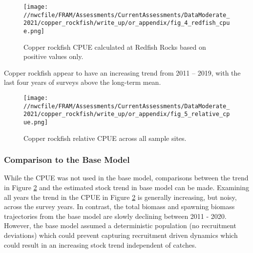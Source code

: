 \documentclass[11pt,
  english,
  a4paper,
]{article}
\begin{document}
\begin{figure}
\centering
\texttt{[image: //nwcfile/FRAM/Assessments/CurrentAssessments/DataModerate\_2021/copper\_rockfish/write\_up/or\_appendix/fig\_4\_redfish\_cpue.png]}
\caption{Copper rockfish CPUE calculated at Redfish Rocks based on positive values only.\label{fig:fig-4}}
\end{figure}

\tagmcend\tagstructend


Copper rockfish appear to have an increasing trend from 2011 -- 2019, with the last four years of surveys above the long-term mean.

\leavevmode\tagmcend\tagstructend\par


\begin{figure}
\centering
\texttt{[image: //nwcfile/FRAM/Assessments/CurrentAssessments/DataModerate\_2021/copper\_rockfish/write\_up/or\_appendix/fig\_5\_relative\_cpue.png]}
\caption{Copper rockfish relative CPUE across all sample sites.\label{fig:fig-5}}
\end{figure}

\tagmcend\tagstructend


\hypertarget{comparison-to-the-base-model}{%
\subsubsection{Comparison to the Base Model}\label{comparison-to-the-base-model}}

\leavevmode\tagmcend\tagstructend


While the CPUE was not used in the base model, comparisons between the trend in Figure \ref{fig:fig-5} and the estimated stock trend in base model can be made. Examining all years the trend in the CPUE in Figure \ref{fig:fig-5} is generally increasing, but noisy, across the survey years. In contrast, the total biomass and spawning biomass trajectories from the base model are slowly declining between 2011 - 2020. However, the base model assumed a deterministic population (no recruitment deviations) which could prevent capturing recruitment driven dynamics which could result in an increasing stock trend independent of catches.
\end{document}
